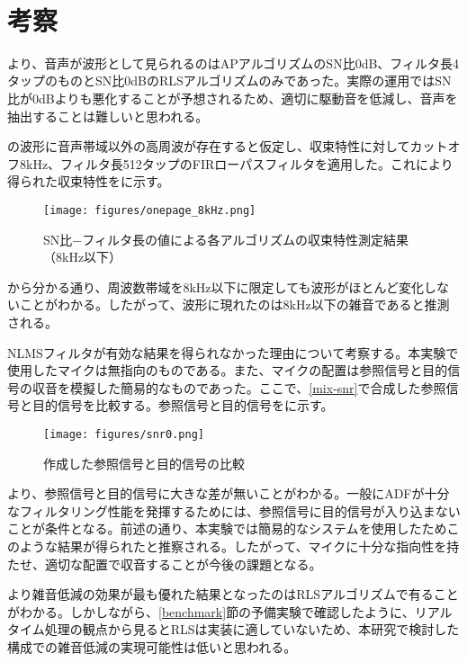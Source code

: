 \
\section{考察}\label{consideration-practice}

より、音声が波形として見られるのはAPアルゴリズムのSN比0dB、フィルタ長4タップのものとSN比0dBのRLSアルゴリズムのみであった。実際の運用ではSN比が0dBよりも悪化することが予想されるため、適切に駆動音を低減し、音声を抽出することは難しいと思われる。

の波形に音声帯域以外の高周波が存在すると仮定し、収束特性に対してカットオフ8kHz、フィルタ長512タップのFIRローパスフィルタを適用した。これにより得られた収束特性をに示す。

\begin{figure}[H]
\centering
\texttt{[image: figures/onepage\_8kHz.png]}
\label{fig:onepage_8kHz}
\caption{SN比−フィルタ長の値による各アルゴリズムの収束特性測定結果（8kHz以下）}
\end{figure}

から分かる通り、周波数帯域を8kHz以下に限定しても波形がほとんど変化しないことがわかる。したがって、波形に現れたのは8kHz以下の雑音であると推測される。

NLMSフィルタが有効な結果を得られなかった理由について考察する。本実験で使用したマイクは無指向のものである。また、マイクの配置は参照信号と目的信号の収音を模擬した簡易的なものであった。ここで、\ref{mix-snr}で合成した参照信号と目的信号を比較する。参照信号と目的信号をに示す。

\begin{figure}[H]
\centering
\texttt{[image: figures/snr0.png]}
\caption{作成した参照信号と目的信号の比較}
\label{fig:compare_x_d}
\end{figure}

より、参照信号と目的信号に大きな差が無いことがわかる。一般にADFが十分なフィルタリング性能を発揮するためには、参照信号に目的信号が入り込まないことが条件となる。前述の通り、本実験では簡易的なシステムを使用したためこのような結果が得られたと推察される。したがって、マイクに十分な指向性を持たせ、適切な配置で収音することが今後の課題となる。

より雑音低減の効果が最も優れた結果となったのはRLSアルゴリズムで有ることがわかる。しかしながら、\ref{benchmark}節の予備実験で確認したように、リアルタイム処理の観点から見るとRLSは実装に適していないため、本研究で検討した構成での雑音低減の実現可能性は低いと思われる。
